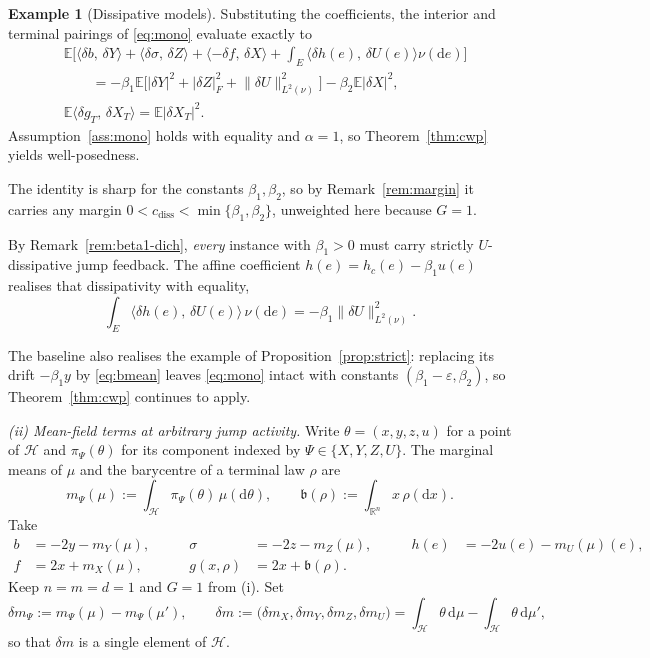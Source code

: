 \documentclass[preprint,12pt]{elsarticle}
\newcommand{\R}{\mathbb{R}}
\newcommand{\E}{\mathbb{E}}
\newcommand{\diff}{\mathrm{d}}
\newcommand{\inner}[2]{\langle #1,\,#2\rangle}
\newcommand{\Lnu}{L^2(\nu)}
\newcommand{\Lnorm}[1]{\lVert #1\rVert_{\Lnu}}
\numberwithin{equation}{section}
\theoremstyle{plain}
\theoremstyle{definition}
\theoremstyle{\PaperRemarkStyle}
\newtheorem{example}[theorem]{Example}
\begin{document}
\begin{example}[Dissipative models]
Substituting the coefficients, the interior and terminal pairings of \eqref{eq:mono} evaluate
exactly to
\[
\begin{aligned}
&\E\big[\inner{\delta b}{\delta Y}+\inner{\delta\sigma}{\delta Z}+\inner{-\delta f}{\delta X}
+\textstyle\int_E\inner{\delta h(e)}{\delta U(e)}\nu(\diff e)\big]\\
&\qquad=-\beta_1\E\big[|\delta Y|^2+|\delta Z|_F^2+\Lnorm{\delta U}^2\big]-\beta_2\E|\delta X|^2,\\
&\E\inner{\delta g_T}{\delta X_T}=\E|\delta X_T|^2 .
\end{aligned}
\]
Assumption~\ref{ass:mono} holds with equality and $\alpha=1$, so Theorem~\ref{thm:cwp}
yields well-posedness.

The identity is sharp for the constants $\beta_1,\beta_2$, so by Remark~\ref{rem:margin} it
carries any margin $0<c_{\mathrm{diss}}<\min\{\beta_1,\beta_2\}$, unweighted here because
$G=1$.

By Remark~\ref{rem:beta1-dich}, \emph{every} instance with $\beta_1>0$ must carry strictly
$U$-dissipative jump feedback. The affine coefficient $h(e)=h_c(e)-\beta_1u(e)$ realises that
dissipativity with equality,
\[
\int_E\inner{\delta h(e)}{\delta U(e)}\,\nu(\diff e)=-\beta_1\Lnorm{\delta U}^2 .
\]

The baseline also realises the example of Proposition~\ref{prop:strict}: replacing its
drift $-\beta_1y$ by \eqref{eq:bmean} leaves \eqref{eq:mono} intact with constants
$(\beta_1-\varepsilon,\beta_2)$, so Theorem~\ref{thm:cwp} continues to apply.

\smallskip
\emph{(ii) Mean-field terms at arbitrary jump activity.} Write $\theta=(x,y,z,u)$ for a point
of $\mathcal H$ and $\pi_\Psi(\theta)$ for its component indexed by
$\Psi\in\{X,Y,Z,U\}$. The marginal
means of $\mu$ and the barycentre of a terminal law $\rho$ are
\[
m_\Psi(\mu):=\int_{\mathcal H}\pi_\Psi(\theta)\,\mu(\diff\theta),\qquad
\mathfrak b(\rho):=\int_{\R^n}x\,\rho(\diff x) .
\]
Take
\[
\begin{aligned}
b&=-2y-m_Y(\mu), &\qquad \sigma&=-2z-m_Z(\mu), &\qquad h(e)&=-2u(e)-m_U(\mu)(e),\\
f&=2x+m_X(\mu), &\qquad g(x,\rho)&=2x+\mathfrak b(\rho) .
\end{aligned}
\]
Keep $n=m=d=1$ and $G=1$ from (i). Set
\[
\delta m_\Psi:=m_\Psi(\mu)-m_\Psi(\mu'),\qquad
\delta m:=\big(\delta m_X,\delta m_Y,\delta m_Z,\delta m_U\big)
=\int_{\mathcal H}\theta\,\diff\mu-\int_{\mathcal H}\theta\,\diff\mu' ,
\]
so that $\delta m$ is a single element of $\mathcal H$.


\end{example}
\end{document}
